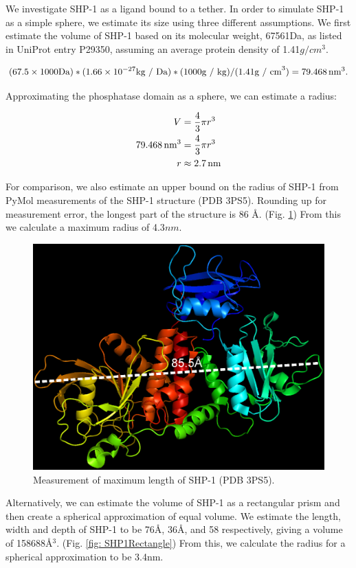 \documentclass[../../AdvancementSummary.tex]{subfiles}
\begin{document}
We investigate SHP-1 as a ligand bound to a tether. In order to simulate SHP-1 as a simple sphere, we estimate its size using three different assumptions. We first estimate the volume of SHP-1 based on its molecular weight, 67561Da,  as listed in UniProt entry P29350, assuming an average protein density of 1.41$g/cm^3$. \cite{Fischer2004}


\begin{equation*}
(67.5 \times 1000 \mbox{Da}) * (1.66\times10^{-27} \mbox{kg / Da}) * (1000 \mbox{g / kg}) / (1.41 \mbox{g / cm}^3) = 79.468 \,\mbox{nm}^3.
\end{equation*}

Approximating the phosphatase domain as a sphere, we can estimate a radius: 

\begin{align*}
V &= \frac{4}{3}\pi r^3 \\
79.468 \,\mbox{nm}^3 &= \frac{4}{3} \pi r^3 \\
r &\approx 2.7 \,\mbox{nm} \\
\end{align*}

For comparison, we also estimate an upper bound on the radius of SHP-1 from PyMol measurements of the SHP-1 structure (PDB 3PS5). Rounding up for measurement error, the longest part of the structure is 86 \AA. (Fig. \ref{fig: SHP1Diag}) From this we calculate a maximum radius of 4.3$nm$.

\begin{figure}[H]
\begin{center}
\includegraphics[width=0.5\linewidth]{ResultsFigures/SHP1PyMol/Diagonal1.eps}
\end{center}
\caption{Measurement of maximum length of SHP-1 (PDB 3PS5). \label{fig: SHP1Diag}}
\end{figure}

Alternatively, we can estimate the volume of SHP-1 as a rectangular prism and then create a spherical approximation of equal volume. We estimate the length, width and depth of SHP-1 to be 76\AA, 36\AA, and 58\text{\AA} respectively, giving a volume of 158688\AA$^3$.  (Fig. \ref{fig: SHP1Rectangle}) From this, we calculate the radius for a spherical approximation to be 3.4nm.
\end{document}
